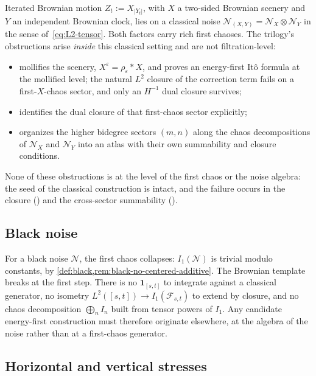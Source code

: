 \documentclass[11pt,reqno]{amsart}
\theoremstyle{plain}
\theoremstyle{definition}
\theoremstyle{remark}
\newcommand{\IBM}{Z}
\begin{document}
Iterated Brownian motion $\IBM_t:=X_{|Y_t|}$, with $X$ a two-sided
Brownian scenery and $Y$ an independent Brownian clock, lies on a
classical noise $\mathcal N_{(X,Y)}=\mathcal N_X\otimes\mathcal N_Y$
in the sense of~\eqref{eq:L2-tensor}. Both factors carry rich first
chaoses. The trilogy's obstructions arise \emph{inside} this
classical setting and are not filtration-level:
\begin{itemize}
\item[--] \cite{EnergyFirst} mollifies the scenery,
$X^\varepsilon=\rho_\varepsilon*X$, and proves an energy-first It\^o
formula at the mollified level; the natural $L^2$ closure of the
correction term fails on a first-$X$-chaos sector, and only an
$H^{-1}$ dual closure survives;
\item[--] \cite{FCDC} identifies the dual closure of that
first-chaos sector explicitly;
\item[--] \cite{BidegreeAtlas} organizes the higher bidegree sectors
$(m,n)$ along the chaos decompositions of $\mathcal N_X$ and
$\mathcal N_Y$ into an atlas with their own summability and closure
conditions.
\end{itemize}
None of these obstructions is at the level of the first chaos or the
noise algebra: the seed of the classical construction is intact,
and the failure occurs in the closure (\cite{EnergyFirst,FCDC}) and
the cross-sector summability (\cite{BidegreeAtlas}).

\subsection{Black noise}\label{sec:cal-black}

For a black noise $\mathcal N$, the first chaos collapses:
$I_1(\mathcal N)$ is trivial modulo constants, by
\cref{def:black,rem:black-no-centered-additive}. The Brownian
template breaks at the first step. There is no $\mathbf 1_{[s,t]}$
to integrate against a classical generator, no isometry
$L^2([s,t])\to I_1(\mathcal F_{s,t})$ to extend by closure, and no
chaos decomposition $\bigoplus_n I_n$ built from tensor powers of
$I_1$. Any candidate energy-first construction must therefore
originate elsewhere, at the algebra of the noise rather than at a
first-chaos generator.

\subsection{Horizontal and vertical stresses}\label{sec:cal-metaphor}
\end{document}
